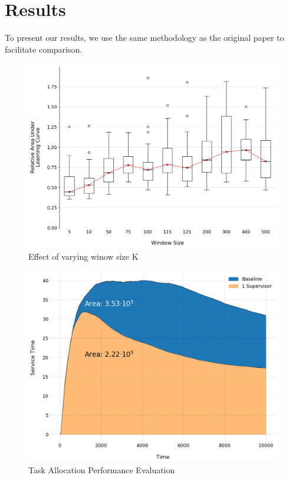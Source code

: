 \documentclass[letterpaper]{article}
\begin{document}
\section{Results}
To present our results, we use the same methodology as the original paper to facilitate comparison.
\begin{figure}[ht]
 \begin{center}
  \includegraphics[width=\linewidth]{figures/figure4_extended}
  \caption{Effect of varying winow size K}
  \label{fig:windows}
 \end{center}
\end{figure}
\begin{figure}[ht]
 \begin{center}
  \includegraphics[width=\linewidth]{figures/figure5_light}
  \caption{Task Allocation Performance Evaluation}
  \label{fig:areas}
 \end{center}
\end{figure}
\end{document}
